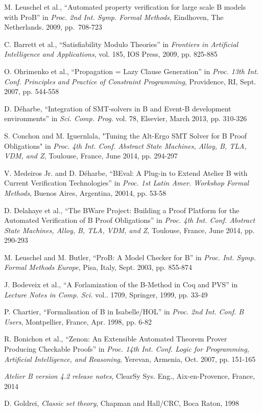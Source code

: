 \documentclass[12pt,journal,duplex]{IEEEtran}
\begin{document}
\begin{thebibliography}{2}
		M. Leuschel et al., ``Automated property verification for large scale B models with ProB'' in \emph{Proc. 2nd Int. Symp. Formal Methods}, Eindhoven, The Netherlands. 2009, pp.~708-723

		C. Barrett et al., ``Satisfiability Modulo Theories'' in \emph{Frontiers in Artificial Intelligence and Applications}, vol. 185, IOS Press, 2009, pp. 825-885
		
		O. Ohrimenko et al., ``Propagation = Lazy Clause Generation'' in \emph{Proc. 13th Int. Conf. Principles and Practice of Constraint Programming}, Providence, RI, Sept. 2007, pp. 544-558
		
		D. D\'{e}harbe, ``Integration of SMT-solvers in B and Event-B development environments'' in \emph{Sci. Comp. Prog.} vol. 78, Elsevier, March 2013, pp. 310-326

		S. Conchon and M. Iguernlala, "Tuning the Alt-Ergo SMT Solver for B Proof Obligations" in \emph{Proc. 4th Int. Conf. Abstract State Machines, Alloy, B, TLA, VDM, and Z}, Toulouse, France, June 2014, pp. 294-297

		V. Medeiros Jr. and D. D\'{e}harbe, ``BEval: A Plug-in to Extend Atelier B with Current Verification Technologies'' in \emph{Proc. 1st Latin Amer. Workshop Formal Methods}, Buenos Aires, Argentina, 20014, pp. 53-58

		D. Delahaye et al., ``The BWare Project: Building a Proof Platform for the Automated Verification of B Proof Obligations'' in \emph{Proc. 4th Int. Conf. Abstract State Machines, Alloy, B, TLA, VDM, and Z}, Toulouse, France, June 2014, pp. 290-293

		M. Leuschel and M. Butler, ``ProB: A Model Checker for B'' in \emph{Proc. Int. Symp. Formal Methods Europe}, Pisa, Italy, Sept. 2003, pp. 855-874
		
		J. Bodeveix et al., ``A Forlamization of the B-Method in Coq and PVS'' in \emph{Lecture Notes in Comp. Sci.} vol.. 1709, Springer, 1999, pp. 33-49
		
		P. Chartier, ``Formalisation of B in Isabelle/HOL'' in \emph{Proc. 2nd Int. Conf. B Users}, Montpellier, France, Apr. 1998, pp. 6-82
		
		R. Bonichon et al., ``Zenon: An Extensible Automated Theorem Prover Producing Checkable Proofs'' in \emph{Proc. 14th Int. Conf. Logic for Programming, Artificial Intelligence, and Reasoning}, Yerevan, Armenia, Oct. 2007, pp. 151-165

		\emph{Atelier B version 4.2 release notes}, ClearSy Sys. Eng., Aix-en-Provence, France, 2014

		D. Goldrei, \emph{Classic set theory}, Chapman and Hall/CRC, Boca Raton, 1998

	\end{thebibliography}
\end{document}
